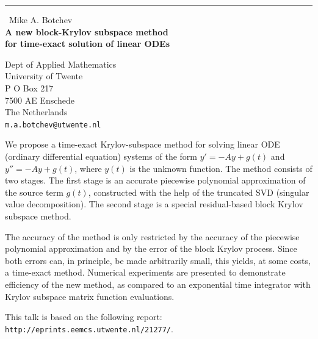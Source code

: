 \documentclass{report}
\begin{document}
\begin{center}
\rule{6in}{1pt} \
{\large Mike A. Botchev \\
{\bf A new block-Krylov subspace method\\ for time-exact solution of linear ODEs}}

Dept of Applied Mathematics \\ University of Twente \\ P O Box 217 \\ 7500 AE Enschede \\ The Netherlands
\\
{\tt m.a.botchev@utwente.nl}\end{center}

We propose a time-exact Krylov-subspace method for solving linear ODE
(ordinary differential equation) systems of the form $y'=-Ay + g(t)$ and
$y''=-Ay + g(t)$, where $y(t)$ is the unknown function. The method
consists of two stages. The first stage is an accurate piecewise
polynomial approximation of the source term $g(t)$, constructed with the
help of the truncated SVD (singular value decomposition). The second
stage is a special residual-based block Krylov subspace method.

The accuracy of the method is only restricted by the accuracy of the
piecewise polynomial approximation and by the error of the block Krylov
process. Since both errors can, in principle, be made arbitrarily small,
this yields, at some costs, a time-exact method. Numerical experiments
are presented to demonstrate efficiency of the new method, as compared to
an exponential time integrator with Krylov subspace matrix function
evaluations.

This talk is based on the following report:
\texttt{http://eprints.eemcs.utwente.nl/21277/}.
\end{document}
